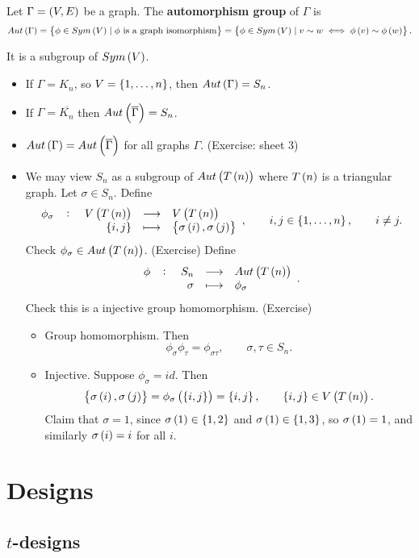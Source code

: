 \begin{definition*}
Let $ \Gamma = \br{V, E} $ be a graph. The \textbf{automorphism group} of $ \Gamma $ is
$$ Aut\br{\Gamma} = \cbr{\phi \in Sym\br{V} \mid \phi \ \text{is a graph isomorphism}} = \cbr{\phi \in Sym\br{V} \mid v \sim w \iff \phi\br{v} \sim \phi\br{w}}. $$
\end{definition*}

It is a subgroup of $ Sym\br{V} $.

\begin{example*}
\hfill
\begin{itemize}
\item If $ \Gamma = K_n $, so $ V = \cbr{1, \dots, n} $, then $ Aut\br{\Gamma} = S_n $.
\item If $ \Gamma = \overline{K_n} $ then $ Aut\br{\overline{\Gamma}} = S_n $.
\item $ Aut\br{\Gamma} = Aut\br{\overline{\Gamma}} $ for all graphs $ \Gamma $. (Exercise: sheet $ 3 $)
\item We may view $ S_n $ as a subgroup of $ Aut\br{T\br{n}} $ where $ T\br{n} $ is a triangular graph. Let $ \sigma \in S_n $. Define
$$ \function[\phi_\sigma]{V\br{T\br{n}}}{V\br{T\br{n}}}{\cbr{i, j}}{\cbr{\sigma\br{i}, \sigma\br{j}}}, \qquad i, j \in \cbr{1, \dots, n}, \qquad i \ne j. $$
Check $ \phi_\sigma \in Aut\br{T\br{n}} $. (Exercise) Define
$$ \function[\phi]{S_n}{Aut\br{T\br{n}}}{\sigma}{\phi_\sigma}. $$
Check this is a injective group homomorphism. (Exercise)
\begin{itemize}
\item Group homomorphism. Then
$$ \phi_\sigma\phi_\tau = \phi_{\sigma\tau}, \qquad \sigma, \tau \in S_n. $$
\item Injective. Suppose $ \phi_\sigma = id $. Then
$$ \cbr{\sigma\br{i}, \sigma\br{j}} = \phi_\sigma\br{\cbr{i, j}} = \cbr{i, j}, \qquad \cbr{i, j} \in V\br{T\br{n}}. $$
Claim that $ \sigma = 1 $, since $ \sigma\br{1} \in \cbr{1, 2} $ and $ \sigma\br{1} \in \cbr{1, 3} $, so $ \sigma\br{1} = 1 $, and similarly $ \sigma\br{i} = i $ for all $ i $.
\end{itemize}
\end{itemize}
\end{example*}

\pagebreak

\section{Designs}

\subsection{\texorpdfstring{$ t $}{t}-designs}

